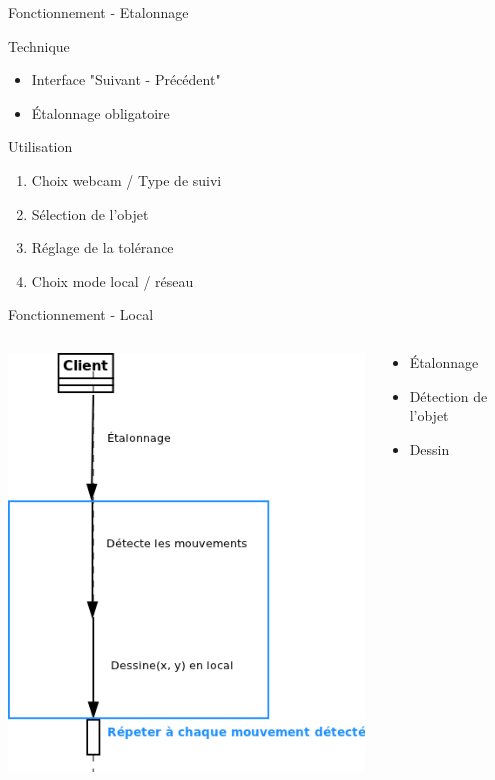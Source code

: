 \documentclass{beamer}
\begin{document}
		\begin{frame}{Fonctionnement - Etalonnage}
			\begin{block}{Technique}
				\begin{itemize}
					\item Interface "Suivant - Précédent"
					\item Étalonnage obligatoire
				\end{itemize}
			\end{block}
			\begin{block}{Utilisation}
				\begin{enumerate}
					\item Choix webcam / Type de suivi
					\item Sélection de l'objet
					\item Réglage de la tolérance
					\item Choix mode local / réseau
				\end{enumerate}
			\end{block}
			
		\end{frame}
		
		\begin{frame}{Fonctionnement - Local}
			\begin{columns}
				\begin{column}{5cm}
					\includegraphics[scale=0.45]{sequence_local.png}
				\end{column}
				\begin{column}{3cm}
					\begin{itemize}
						\item Étalonnage
						\item Détection de l'objet
						\item Dessin
					\end{itemize}
				\end{column}
			\end{columns}
		\end{frame}
		
\end{document}
